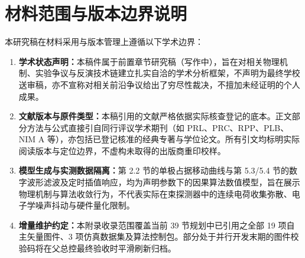 \section{材料范围与版本边界说明}\label{sec:appF-scope-boundary}

本研究稿在材料采用与版本管理上遵循以下学术边界：
\begin{enumerate}[label=(\arabic*),leftmargin=2em]
    \item \textbf{学术状态声明：}本稿件属于前置章节研究稿（写作中），旨在对相关物理机制、实验争议与反演技术链建立扎实自洽的学术分析框架，不声明为最终学校送审稿，亦不宣称对相关前沿争议给出了穷尽性裁决，不擅加未经证明的个人成果。
    \item \textbf{文献版本与原件类型：}本稿引用的文献严格依据实际核查登记的底本。正文部分方法与公式直接引自同行评议学术期刊（如 PRL、PRC、RPP、PLB、NIM A 等），亦包括已登记核准的经典专著与学位论文。所有引文均标明实际阅读版本与定位边界，不虚构未取得的出版商重印校样。
    \item \textbf{模型生成与实测数据隔离：}第 2.2 节的单极占据移动曲线与第 5.3/5.4 节的数字波形滤波及定时插值响应，均为声明参数下的因果算法数值模型，旨在展示物理机制与算法收敛行为，不代表实际在束探测器中的连续电荷收集弥散、电子学噪声抖动与硬件量化限制。
    \item \textbf{增量维护约定：}本附录收录范围覆盖当前 39 节规划中已引用之全部 19 项自主矢量图件、3 项仿真数据集及算法控制包。部分处于并行开发末期的图件校验码将在父总控最终验收时平滑刷新归档。
\end{enumerate}
